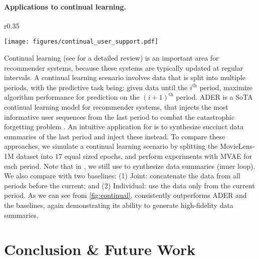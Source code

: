\documentclass{article}
\begin{document}
\paragraph{Applications to continual learning.} 

\begin{wrapfigure}{r}{0.35\textwidth}
  \vspace{-0.8cm}
  \begin{center}
    \texttt{[image: figures/continual\_user\_support.pdf]}
  \end{center}
  \vspace{-0.2cm}
  \caption{\sampler for continual learning.}
  \label{fig:continual}
  \vspace{-0.3cm}
\end{wrapfigure}

Continual learning (see \cite{continual} for a detailed review) is an important area for recommender systems, because these systems are typically updated at regular intervals. A continual learning scenario involves data that is split into multiple periods, with the predictive task being: given data until the $i^{\text{th}}$ period, maximize algorithm performance for prediction on the $(i+1)^{\text{th}}$ period. \textsc{ADER} \cite{ader} is a SoTA continual learning model for recommender systems, that injects the most informative user sequences from the last period to combat the catastrophic forgetting problem \cite{catast_forgetting}. 
An intuitive application for \sampler is to synthesize succinct data summaries of the last period and inject these instead. 
To compare these approaches, we simulate a continual learning scenario by splitting the MovieLens-1M dataset into $17$ equal sized epochs, and perform experiments with MVAE \cite{mvae} for each period. Note that in \sampler, we still use \model to synthesize data summaries (inner loop).
We also compare with two baselines: (1) Joint: concatenate the data from all periods before the current; and (2) Individual: use the data only from the current period. As we can see from \cref{fig:continual}, \sampler consistently outperforms \textsc{ADER} and the baselines, again demonstrating its ability to generate high-fidelity data summaries.










\section{Conclusion \& Future Work}
\end{document}
